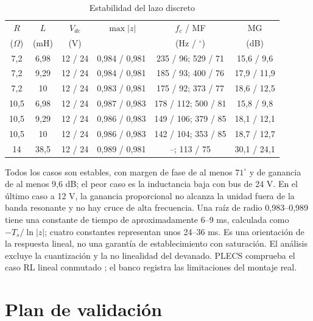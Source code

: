 \documentclass[conference]{IEEEtran}
\begin{document}
\begin{table}[H]\caption{Estabilidad del lazo discreto}\centering\small
\begin{tabular}{@{}cc@{\hspace{4pt}}c@{\hspace{4pt}}c@{\hspace{4pt}}c@{\hspace{4pt}}c@{}}\toprule
$R$ & $L$ & $V_{dc}$ & $\max|z|$ & $f_c$ / MF & MG\\
($\Omega$) & (mH) & (V) & & (Hz / $^\circ$) & (dB)\\\midrule
7,2 & 6,98 & 12 / 24 & 0,984 / 0,981 & 235 / 96; 529 / 71 & 15,6 / 9,6\\
7,2 & 9,29 & 12 / 24 & 0,984 / 0,981 & 185 / 93; 400 / 76 & 17,9 / 11,9\\
7,2 & 10 & 12 / 24 & 0,983 / 0,981 & 175 / 92; 373 / 77 & 18,6 / 12,5\\
10,5 & 6,98 & 12 / 24 & 0,987 / 0,983 & 178 / 112; 500 / 81 & 15,8 / 9,8\\
10,5 & 9,29 & 12 / 24 & 0,986 / 0,983 & 149 / 106; 379 / 85 & 18,1 / 12,1\\
10,5 & 10 & 12 / 24 & 0,986 / 0,983 & 142 / 104; 353 / 85 & 18,7 / 12,7\\
14 & 38,5 & 12 / 24 & 0,989 / 0,981 & --; 113 / 75 & 30,1 / 24,1\\\bottomrule
\end{tabular}\label{tab:estabilidad}\end{table}

Todos los casos son estables, con margen de fase de al menos $71^\circ$ y de ganancia de al menos 9,6 dB; el peor caso es la inductancia baja con bus de 24 V. En el último caso a 12 V, la ganancia proporcional no alcanza la unidad fuera de la banda resonante y no hay cruce de alta frecuencia. Una raíz de radio 0,983--0,989 tiene una constante de tiempo de aproximadamente 6--9 ms, calculada como $-T_s/\ln|z|$; cuatro constantes representan unos 24--36 ms. Es una orientación de la respuesta lineal, no una garantía de establecimiento con saturación. El análisis excluye la cuantización y la no linealidad del devanado. PLECS comprueba el caso RL lineal conmutado \cite{plecs}; el banco registra las limitaciones del montaje real.

\section{Plan de validación}
\end{document}
